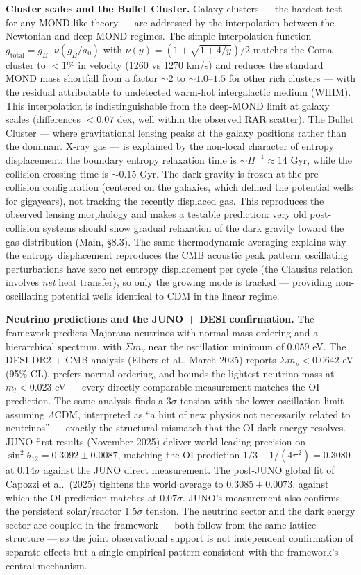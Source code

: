 \documentclass[
]{article}
\begin{document}
\textbf{Cluster scales and the Bullet Cluster.} Galaxy clusters --- the
hardest test for any MOND-like theory --- are addressed by the
interpolation between the Newtonian and deep-MOND regimes. The simple
interpolation function \(g_{\text{total}} = g_B \cdot \nu(g_B/a_0)\)
with \(\nu(y) = (1 + \sqrt{1+4/y})/2\) matches the Coma cluster to
\(< 1\%\) in velocity (1260 vs 1270 km/s) and reduces the standard MOND
mass shortfall from a factor \(\sim 2\) to \(\sim 1.0\)--\(1.5\) for
other rich clusters --- with the residual attributable to undetected
warm-hot intergalactic medium (WHIM). This interpolation is
indistinguishable from the deep-MOND limit at galaxy scales (differences
\(< 0.07\) dex, well within the observed RAR scatter). The Bullet
Cluster --- where gravitational lensing peaks at the galaxy positions
rather than the dominant X-ray gas --- is explained by the non-local
character of entropy displacement: the boundary entropy relaxation time
is \(\sim H^{-1} \approx 14\) Gyr, while the collision crossing time is
\(\sim 0.15\) Gyr. The dark gravity is frozen at the pre-collision
configuration (centered on the galaxies, which defined the potential
wells for gigayears), not tracking the recently displaced gas. This
reproduces the observed lensing morphology and makes a testable
prediction: very old post-collision systems should show gradual
relaxation of the dark gravity toward the gas distribution (Main, §8.3).
The same thermodynamic averaging explains why the entropy displacement
reproduces the CMB acoustic peak pattern: oscillating perturbations have
zero net entropy displacement per cycle (the Clausius relation involves
\emph{net} heat transfer), so only the growing mode is tracked ---
providing non-oscillating potential wells identical to CDM in the linear
regime.

\textbf{Neutrino predictions and the JUNO + DESI confirmation.} The
framework predicts Majorana neutrinos with normal mass ordering and a
hierarchical spectrum, with \(\Sigma m_\nu\) near the oscillation
minimum of 0.059 eV. The DESI DR2 + CMB analysis (Elbers et al., March
2025) reports \(\Sigma m_\nu < 0.0642\) eV (95\% CL), prefers normal
ordering, and bounds the lightest neutrino mass at \(m_l < 0.023\) eV
--- every directly comparable measurement matches the OI prediction. The
same analysis finds a \(3\sigma\) tension with the lower oscillation
limit assuming \(\Lambda\)CDM, interpreted as ``a hint of new physics
not necessarily related to neutrinos'' --- exactly the structural
mismatch that the OI dark energy resolves. JUNO first results (November
2025) deliver world-leading precision on
\(\sin^2\theta_{12} = 0.3092 \pm 0.0087\), matching the OI prediction
\(1/3 - 1/(4\pi^2) = 0.3080\) at \(0.14\sigma\) against the JUNO direct
measurement. The post-JUNO global fit of Capozzi et al.~(2025) tightens
the world average to \(0.3085 \pm 0.0073\), against which the OI
prediction matches at \(0.07\sigma\). JUNO's measurement also confirms
the persistent solar/reactor 1.5\(\sigma\) tension. The neutrino sector
and the dark energy sector are coupled in the framework --- both follow
from the same lattice structure --- so the joint observational support
is not independent confirmation of separate effects but a single
empirical pattern consistent with the framework's central mechanism.
\end{document}
